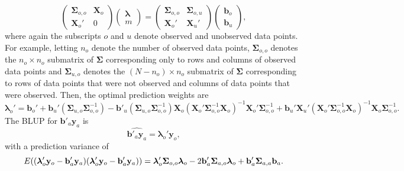 \documentclass[]{interact}
\theoremstyle{plain}%
\theoremstyle{definition}
\theoremstyle{remark}
\begin{document}
\begin{equation}
\begin{pmatrix}
\bm{\Sigma}_{o, o} & \mathbf{X}_o \\
\mathbf{X}_o' & 0
\end{pmatrix} 
\begin{pmatrix}
\bm{\lambda} \\
m
\end{pmatrix} = 
\begin{pmatrix}
\bm{\Sigma}_{o, o} & \bm{\Sigma}_{o, u} \\
\mathbf{X}_{o}' & \mathbf{X}_{u}'
\end{pmatrix} 
\begin{pmatrix}
\mathbf{b}_{o} \\
\mathbf{b}_{u}
\end{pmatrix},
\end{equation} \noindent where again the subscripts \(o\) and \(u\)
denote observed and unobserved data points. For example, letting \(n_o\)
denote the number of observed data points, \(\bm{\Sigma}_{o, o}\)
denotes the \(n_o \times n_o\) submatrix of \(\bm{\Sigma}\)
corresponding only to rows and columns of observed data points and
\(\bm{\Sigma}_{u, o}\) denotes the \((N - n_o) \times n_o\) submatrix of
\(\bm{\Sigma}\) corresponding to rows of data points that were not
observed and columns of data points that were observed. Then, the
optimal prediction weights are \mbox{} \begin{equation}
\bm{\lambda}_o' = \mathbf{b}_{o}' + \mathbf{b}_{u}' (\bm{\Sigma}_{u, o}\bm{\Sigma}_{o, o}^{-1}) - \mathbf{b}'_{u}(\bm{\Sigma}_{u, o} \bm{\Sigma}_{o, o}^{-1})\mathbf{X}_o(\mathbf{X}_o'\bm{\Sigma}_{o, o}^{-1}\mathbf{X}_o)^{-1}\mathbf{X}_o'\bm{\Sigma}_{o, o}^{-1} + \mathbf{b}_{u}' \mathbf{X}_{u}'(\mathbf{X}_o'\bm{\Sigma}_{o, o}^{-1}\mathbf{X}_o)^{-1}\mathbf{X}_o \bm{\Sigma}_{o, o}^{-1}.
\end{equation} \noindent The BLUP for \(\mathbf{b}'_a \mathbf{y}_a\) is
\mbox{} \begin{equation}
\widehat{\mathbf{b}'_a \mathbf{y}_a} = \bm{\lambda}_o' \mathbf{y}_o,
\end{equation} \noindent with a prediction variance of \mbox{}
\begin{equation}
E((\bm{\lambda}_o'\mathbf{y}_o - \mathbf{b}_a'\mathbf{y}_a)(\bm{\lambda}_o'\mathbf{y}_o - \mathbf{b}_a'\mathbf{y}_a)) = \\
\bm{\lambda}_o'\bm{\Sigma}_{o, o}\bm{\lambda}_o - 2 \mathbf{b}_a' \bm{\Sigma}_{a, o} \bm{\lambda}_o + \mathbf{b}_a' \bm{\Sigma}_{a, a} \mathbf{b}_a.
\end{equation}
\end{document}

